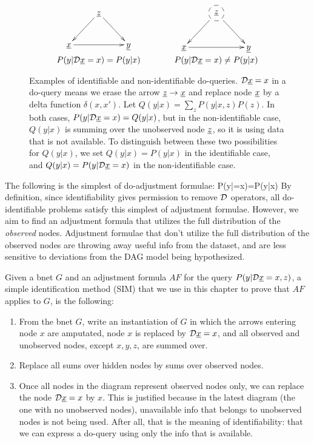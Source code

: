 \begin{figure}[h!]
$$
\begin{array}{ccc}
\xymatrix{
&\rvz\ar[ld]\ar[rd]
\\
\rvx\ar[rr]&&\rvy
}
&\quad\quad&
\xymatrix{
&*++[F-o]{\rvz}\ar[ld]\ar[rd]
\\
\rvx\ar[rr]&&\rvy
}
\\
P(y|\cald\rvx=x)=P(y|x)
&&P(y|\cald\rvx=x)\neq P(y|x)
\end{array}
$$
\caption{Examples of 
identifiable
and non-identifiable
do-queries. ${\cal D}{\underline{x}}=x$
in a do-query
means we erase the arrow
${\underline{z}}\rightarrow{\underline{x}}$
and replace node
${\underline{x}}$ by a delta function
$\delta(x,x')$.
Let $Q(y|x)=\sum_zP(y|x,z)P(z)$.
In both cases,
$P(y|{\cal D}{\underline{x}}=x)=Q(y|x)$, 
but in the non-identifiable
case, $Q(y|x)$
is summing over the
unobserved node ${\underline{z}}$,
so it is using 
data that is not available.
To distinguish between
these two possibilities for $Q(y|x)$,
we set $Q(y|x)=P(y|x)$
in the identifiable case,
and $Q(y|x)=P(y|{\cal D}{\underline{x}}=x)$
in the non-identifiable case.
}
\label{fig-iden-noniden}
\end{figure}

The following is the simplest of
do-adjustment formulae:
\beq
P(y|\cald\rvx=x)=P(y|x)
\eeq
By definition, 
since identifiability
gives permission
to remove ${\cal D}$ operators, all do-identifiable
problems satisfy this simplest 
of adjustment 
formulae. However,
we aim to find 
an adjustment formula that 
utilizes the full distribution
of the {\it observed} nodes. Adjustment
formulae that don't 
utilize the full
distribution 
of the observed nodes are 
throwing
away useful
info
from the dataset, and are less
sensitive to deviations from the DAG model
being hypothesized. 

Given a bnet $G$
and an adjustment formula $AF$
for the query $P(y|{\cal D}{\underline{x}}=x, z)$,
a simple identification method (SIM) that we 
use in this chapter to prove 
that $AF$ 
applies to $G$, is
the following:
\begin{enumerate}
\item
From the bnet $G$,
write 
an instantiation
of $G$ 
in which
the arrows entering
node $x$
are amputated,
node $x$
is replaced
by ${\cal D}{\underline{x}}=x$,
and all observed and
unobserved nodes, 
except 
$x, y, z$,
are summed over.
\item
Replace all
sums over 
hidden nodes
by sums over 
observed nodes.
\item 
Once all
nodes in the diagram
represent
observed nodes only,
we can replace 
the node ${\cal D}{\underline{x}}=x$
by $x$. 
This is 
justified because in
the latest diagram (the one
with no unobserved nodes), unavailable
info  that
belongs to unobserved nodes
is not being used.
After all,
that is the meaning
of 
identifiability:
that we can express
a do-query using
only the info
that is available.
\end{enumerate}

